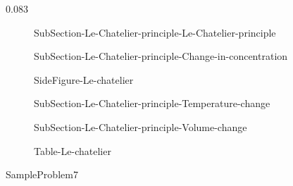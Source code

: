 0.083\documentclass[main.tex]{subfiles}
\newcommand\chapterlabel{Ch-equilibrium}\setcounter{figurenewcounter}{0}\setcounter{tablenewcounter}{0}\setcounter{formulanewcounter}{0}
\begin{document}
\sloppy\begin{description}
\item[] {SubSection-Le-Chatelier-principle-Le-Chatelier-principle}


 \item[] {SubSection-Le-Chatelier-principle-Change-in-concentration}


 


{SideFigure-Le-chatelier}



 \item[] {SubSection-Le-Chatelier-principle-Temperature-change}



 


\newpage
  \item[] 
{SubSection-Le-Chatelier-principle-Volume-change}

   {Table-Le-chatelier}
 
\end{description}





  {SampleProblem7}
\end{document}
